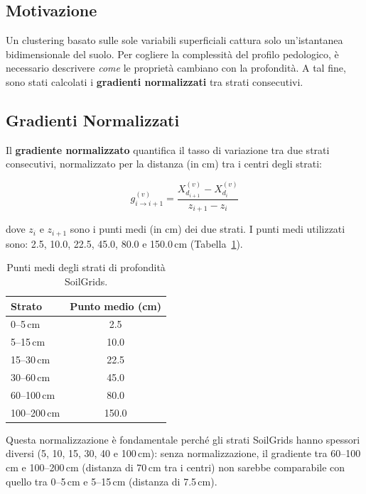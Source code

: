 \documentclass[a4paper,12pt]{article}
\begin{document}
\subsection{Motivazione}

Un clustering basato sulle sole variabili superficiali cattura solo
un'istantanea bidimensionale del suolo. Per cogliere la complessità del
profilo pedologico, è necessario descrivere \emph{come} le proprietà
cambiano con la profondità. A tal fine, sono stati calcolati i
\textbf{gradienti normalizzati} tra strati consecutivi.

\subsection{Gradienti Normalizzati}

Il \textbf{gradiente normalizzato} quantifica il tasso di variazione tra
due strati consecutivi, normalizzato per la distanza (in cm) tra i
centri degli strati:

\begin{equation}
    g^{(v)}_{i \to i+1} = \frac{X^{(v)}_{d_{i+1}} - X^{(v)}_{d_i}}
    {z_{i+1} - z_i}
    \label{eq:gradiente}
\end{equation}

dove $z_i$ e $z_{i+1}$ sono i punti medi (in cm) dei due strati. I
punti medi utilizzati sono: 2.5, 10.0, 22.5, 45.0, 80.0 e 150.0\,cm
(Tabella~\ref{tab:midpoints}).

\begin{table}[H]
    \centering
    \caption{Punti medi degli strati di profondità SoilGrids.}
    \label{tab:midpoints}
    \begin{tabular}{@{}lc@{}}
        \toprule
        \textbf{Strato} & \textbf{Punto medio (cm)} \\
        \midrule
        0--5\,cm    & 2.5   \\
        5--15\,cm   & 10.0  \\
        15--30\,cm  & 22.5  \\
        30--60\,cm  & 45.0  \\
        60--100\,cm & 80.0  \\
        100--200\,cm & 150.0 \\
        \bottomrule
    \end{tabular}
\end{table}
Questa normalizzazione è fondamentale perché gli strati SoilGrids hanno
spessori diversi (5, 10, 15, 30, 40 e 100\,cm): senza normalizzazione,
il gradiente tra 60--100\,cm e 100--200\,cm (distanza di 70\,cm tra i
centri) non sarebbe comparabile con quello tra 0--5\,cm e 5--15\,cm
(distanza di 7.5\,cm).
\end{document}
